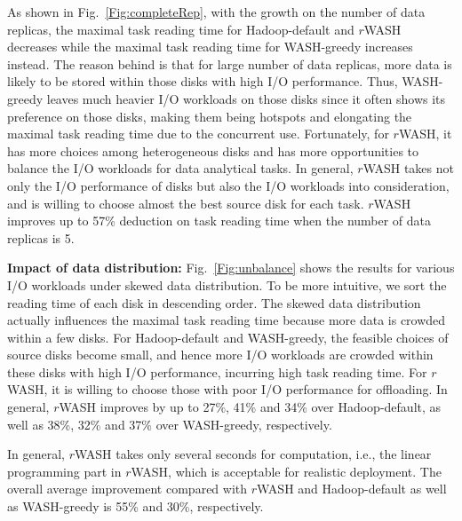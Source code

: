 \documentclass[conference]{IEEEtran}
\begin{document}
As shown in Fig.~\ref{Fig:completeRep}, with the growth on the number of data replicas, the maximal task reading time for Hadoop-default and $r$WASH decreases while the maximal task reading time for WASH-greedy increases instead. The reason behind is that for large number of data replicas, more data is likely to be stored within those disks with high I/O performance. Thus, WASH-greedy leaves much heavier I/O workloads on those disks since it often shows its preference on those disks, making them being hotspots and elongating the maximal task reading time due to the concurrent use. Fortunately, for $r$WASH, it has more choices among heterogeneous disks and has more opportunities to balance the I/O workloads for data analytical tasks. In general, $r$WASH takes not only the I/O performance of disks but also the I/O workloads into consideration, and is willing to choose almost the best source disk for each task. $r$WASH improves up to 57\% deduction on task reading time when the number of data replicas is 5.

 \textbf{Impact of data distribution:} Fig.~\ref{Fig:unbalance} shows the results for various I/O workloads under skewed data distribution. To be more intuitive, we sort the reading time of each disk in descending order.  The skewed data distribution actually influences the maximal task reading time because more data is crowded within a few disks. For Hadoop-default and WASH-greedy, the feasible choices of source disks become small, and hence more I/O workloads are crowded within these disks with high I/O performance, incurring high task reading time. For $r$WASH, it is willing to choose those with poor I/O performance for offloading. In general, $r$WASH improves by up to 27\%, 41\% and 34\% over Hadoop-default, as well as 38\%, 32\% and 37\% over WASH-greedy, respectively.


In general, $r$WASH takes only several seconds for computation, i.e., the linear programming part in $r$WASH, which is acceptable for realistic deployment. The overall average improvement compared with $r$WASH and Hadoop-default as well as WASH-greedy is 55\% and 30\%, respectively.
\end{document}
